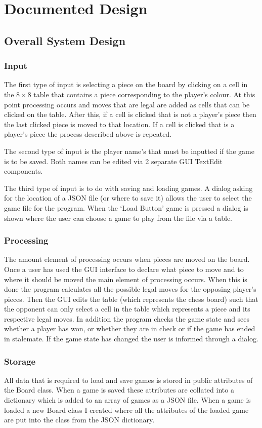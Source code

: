 \documentclass[twoside, 12pt]{report}
\begin{document}
\chapter{Documented Design}
\section{Overall System Design}
\subsection{Input}
The first type of input is selecting a piece on the board by clicking on a cell in the $ 8\times8 $ table that contains a piece corresponding to the player's colour. At this point processing occurs and moves that are legal are added as cells that can be clicked on the table. After this, if a cell is clicked that is not a player's piece then the last clicked piece is moved to that location. If a cell is clicked that is a player's piece the process described above is repeated.

The second type of input is the player name's that must be inputted if the game is to be saved. Both names can be edited via 2 separate GUI TextEdit components. 

The third type of input is to do with saving and loading games. A dialog asking for the location of a JSON file (or where to save it) allows the user to select the game file for the program. When the ‘Load Button' game is pressed a dialog is shown where the user can choose a game to play from the file via a table.
\subsection{Processing}
The amount element of processing occurs when pieces are moved on the board. Once a user has used the GUI interface to declare what piece to move and to where it should be moved the main element of processing occurs. When this is done the program calculates all the possible legal moves for the opposing player's pieces. Then the GUI edits the table (which represents the chess board) such that the opponent can only select a cell in the table which represents a piece and its respective legal moves. In addition the program checks the game state and sees whether a player has won, or whether they are in check or if the game has ended in stalemate. If the game state has changed the user is informed through a dialog. 
\subsection{Storage}
All data that is required to load and save games is stored in public attributes of the Board class. When a game is saved these attributes are collated into a dictionary which is added to an array of games as a JSON file. When a game is loaded a new Board class I created where all the attributes of the loaded game are put into the class from the JSON dictionary.
\end{document}
